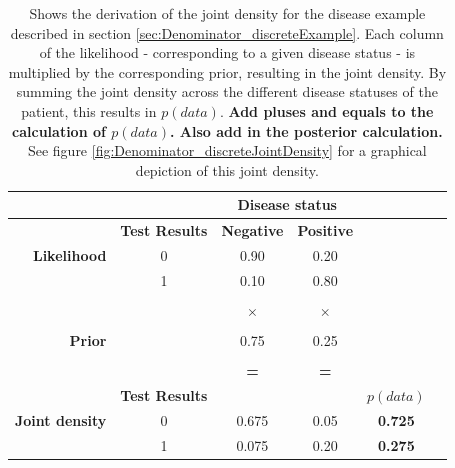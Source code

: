 \documentclass[11pt,fullpage]{book}
\begin{document}
\begin{table}[htbp]
  \centering
  
    \begin{tabular}{rr|cccc}
    
     &       & \multicolumn{2}{c}{\textbf{Disease status}} \\
    \toprule
          & \textbf{Test Results} & \textbf{Negative} & \textbf{Positive} \\
          \midrule
\textbf{Likelihood} & \multicolumn{1}{c}{0}\vline & 0.90   & 0.20 \\
          & \multicolumn{1}{c}{1}\vline & 0.10   & 0.80 \\
          &       & \multicolumn{1}{r}{} & \multicolumn{1}{r}{} \\
          &       & $\times$ & $\times$ \\
          &       & \multicolumn{1}{r}{} & \multicolumn{1}{r}{} \\
    \textbf{Prior} &       & 0.75  & 0.25 \\
    &       & \multicolumn{1}{r}{} & \multicolumn{1}{r}{} \\
          & \textbf{} & \textbf{=} & \textbf{=} \\
&      \textbf{Test Results} & \multicolumn{1}{r}{} & \multicolumn{1}{r}{} & $p(data)$ \\
    \textbf{Joint density} & \multicolumn{1}{c}{0} \vline& 0.675 & 0.05  & \textbf{0.725}\\
          & \multicolumn{1}{c}{1}\vline & 0.075 & 0.20 & \textbf{0.275}\\
    \bottomrule
    \end{tabular}%
    \caption{Shows the derivation of the joint density for the disease example described in section \ref{sec:Denominator_discreteExample}. Each column of the likelihood - corresponding to a given disease status - is multiplied by the corresponding prior, resulting in the joint density. By summing the joint density across the different disease statuses of the patient, this results in $p(data)$. \textbf{Add pluses and equals to the calculation of $p(data)$. Also add in the posterior calculation.} See figure \ref{fig:Denominator_discreteJointDensity} for a graphical depiction of this joint density.}
  \label{tab:Denominator_discreteJoint}%
\end{table}%
\end{document}
